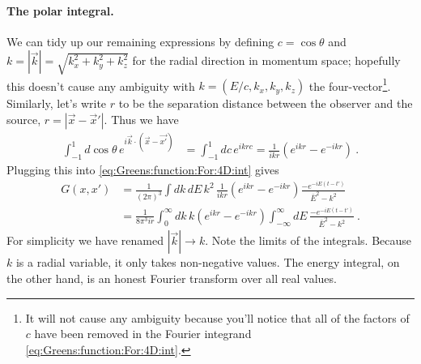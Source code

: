 \documentclass[
  11pt,
	colorful,
	raggedright,
]{tufte-style-thesis-flip}
\begin{document}
\paragraph{The polar integral.}
We can tidy up our remaining expressions by defining $c=\cos\theta$ and $k = |\vec{k}| = \sqrt{k_x^2 + k_y^2+k_z^2}$ for the radial direction in momentum space; hopefully this doesn't cause any ambiguity with $k = (E/c,k_x,k_y,k_z)$ the four-vector\footnote{It will not cause any ambiguity because you'll notice that all of the factors of $c$ have been removed in the Fourier integrand \eqref{eq:Greens:function:For:4D:int}.}. Similarly, let's write $r$ to be the separation distance between the observer and the source, $r=|\vec{x}-\vec{x}'|$. Thus we have
\begin{align}
  \int_{-1}^1 d\cos\theta \, e^{i\vec{k}\cdot(\vec{x}-\vec{x'})}
  &=
  \int_{-1}^1 dc\, e^{ikrc}
  = 
  \frac{1}{ikr}\left(e^{ikr} - e^{-ikr}\right) \ .
\end{align}
Plugging this into \eqref{eq:Greens:function:For:4D:int} gives
\begin{align}
  G(x,x') &=
  \frac{1}{(2\pi)^3}
  \int dk \, dE \, k^2
  \, 
  \frac{1}{ikr}\left(e^{ikr} - e^{-ikr}\right)
  \frac{- e^{-iE (t-t')}}{\bar{E}^2-k^2}
  \\
  &=
  \frac{1}{8\pi^3 ir}
  \int_0^\infty dk\, 
  k \left(e^{ikr} - e^{-ikr}\right)
  \int_{-\infty}^\infty dE \, 
  \frac{-e^{-iE (t-t')}}{\bar{E}^2-k^2}
  \ .
\end{align}
For simplicity we have renamed $|\vec k| \to k$. Note the limits of the integrals. Because $k$ is a radial variable, it only takes non-negative values. The energy integral, on the other hand, is an honest Fourier transform over all real values.
\end{document}
